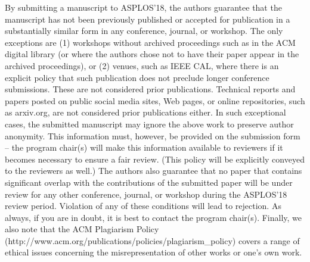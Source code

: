 \documentclass[pageno]{jpaper}
\begin{document}
By submitting a manuscript to ASPLOS'18, the authors guarantee that the
manuscript has not been previously published or accepted for publication in
a substantially similar form in any conference, journal, or workshop. The
only exceptions are (1) workshops without archived proceedings such as in
the ACM digital library (or where the authors chose not to have their paper
appear in the archived proceedings), or (2) venues, such as IEEE CAL, where
there is an explicit policy that such publication does not preclude longer
conference submissions. These are not considered prior publications. 
Technical reports and papers posted on public social media sites, Web pages,
or online repositories, such as arxiv.org, are not considered prior
publications either. In such exceptional cases, the submitted manuscript may
ignore the above work to preserve author anonymity. This information must,
however, be provided on the submission form -- the program chair(s) will
make this information available to reviewers if it becomes necessary to
ensure a fair review. (This policy will be explicitly conveyed to the
reviewers as well.)  The authors also guarantee that no paper that contains
significant overlap with the contributions of the submitted paper will be
under review for any other conference, journal, or workshop during the
ASPLOS'18 review period. Violation of any of these conditions will lead to
rejection.  As always, if you are in doubt, it is best to contact the
program chair(s).  Finally, we also note that the ACM Plagiarism Policy
(http://www.acm.org/publications/policies/plagiarism\_policy) covers a range
of ethical issues concerning the misrepresentation of other works or one's
own work.
\end{document}

